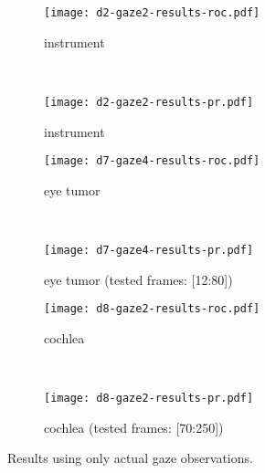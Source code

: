 \begin{figure}[ht]
	\centering
	\begin{subfigure}[h]{0.45\textwidth}
	\texttt{[image: d2-gaze2-results-roc.pdf]}	
		\caption*{instrument}
	\end{subfigure}
	~
	\begin{subfigure}[h]{0.45\textwidth}
	\texttt{[image: d2-gaze2-results-pr.pdf]}	
		\caption*{instrument}
	\end{subfigure}
	
	\vspace{3mm}
	\begin{subfigure}[h]{0.45\textwidth}
	\texttt{[image: d7-gaze4-results-roc.pdf]}	
		\caption*{eye tumor}
	\end{subfigure}
	~
	\begin{subfigure}[h]{0.45\textwidth}
	\texttt{[image: d7-gaze4-results-pr.pdf]}	
		\caption*{eye tumor (tested frames: [12:80])}
	\end{subfigure}	
	
	\vspace{3mm}
	\begin{subfigure}[h]{0.45\textwidth}
	\texttt{[image: d8-gaze2-results-roc.pdf]}	
		\caption*{cochlea}
	\end{subfigure}
	~
	\begin{subfigure}[h]{0.45\textwidth}
	\texttt{[image: d8-gaze2-results-pr.pdf]}	
		\caption*{cochlea (tested frames: [70:250])}
	\end{subfigure}		
	\caption{Results using only actual gaze observations.}
	\label{fig:results-curves}
\end{figure}










